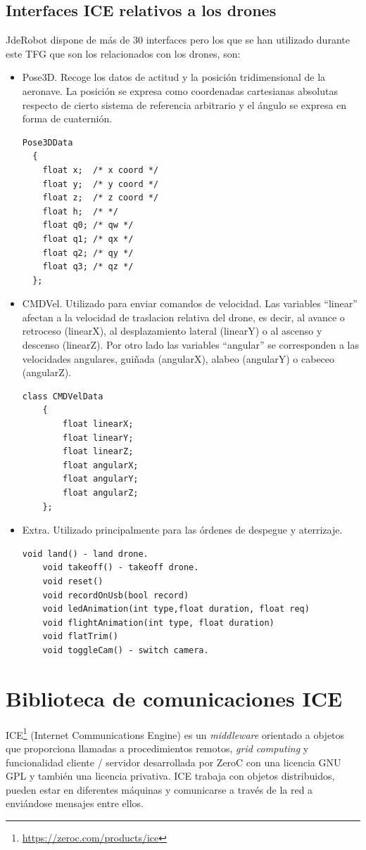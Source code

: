 \subsection{Interfaces ICE relativos a los drones}
JdeRobot dispone de más de 30 interfaces pero los que se han utilizado durante este TFG que son los relacionados con los drones, son:
\begin{itemize}
\item Pose3D. Recoge los datos de actitud y la posici\'on tridimensional de la aeronave. La posición se expresa como coordenadas cartesianas absolutas respecto de cierto sistema de referencia arbitrario
y el ángulo se expresa en forma de cuaternión. 

\begin{lstlisting}[frame=single]
Pose3DData
  {
	float x;  /* x coord */
	float y;  /* y coord */
	float z;  /* z coord */
  	float h;  /* */
	float q0; /* qw */
	float q1; /* qx */
	float q2; /* qy */
	float q3; /* qz */
  };
\end{lstlisting}

\item CMDVel. Utilizado para enviar comandos de velocidad. Las variables ``linear'' afectan a la velocidad de traslacion relativa del drone, es decir, al avance o retroceso (linearX), al desplazamiento lateral (linearY) o al ascenso y descenso (linearZ). Por otro lado las variables ``angular'' se corresponden a las velocidades angulares, guiñada (angularX), alabeo (angularY) o cabeceo (angularZ). 
\begin{lstlisting}[frame=single]
	class CMDVelData
	{
		float linearX;
		float linearY;
		float linearZ;
		float angularX;
		float angularY;
		float angularZ;										
	};
\end{lstlisting}
\item Extra. Utilizado principalmente para las órdenes de despegue y aterrizaje.
\begin{lstlisting}[frame=single]
    void land() - land drone. 
    void takeoff() - takeoff drone. 
    void reset() 
    void recordOnUsb(bool record) 
    void ledAnimation(int type,float duration, float req) 
    void flightAnimation(int type, float duration) 
    void flatTrim() 
    void toggleCam() - switch camera. 
\end{lstlisting}

\end{itemize}

\section{Biblioteca de comunicaciones ICE}
\label{sec:ICE}
ICE\footnote{\url{https://zeroc.com/products/ice}}\cite{ice} (Internet Communications Engine) es un \textit{middleware}  orientado a objetos que proporciona llamadas a procedimientos remotos, \textit{grid computing} y funcionalidad cliente / servidor desarrollada por ZeroC con una licencia GNU GPL y también una licencia privativa. ICE trabaja con objetos distribuidos, pueden estar en diferentes máquinas y comunicarse a través de la red a enviándose mensajes entre ellos. 

